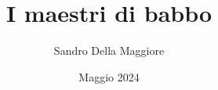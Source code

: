 \documentclass[a4paper,12pt,oneside,openany]{book}%
\begin{document}
	\author{Sandro Della Maggiore}
	\title{I maestri di babbo}
	\date{Maggio 2024}
	\maketitle
	
	
	\tableofcontents
	
\end{document}
